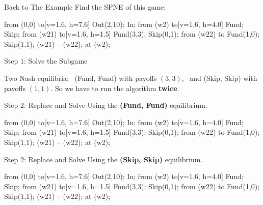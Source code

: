 \begin{frame}{Back to The Example}
Find the SPNE of this game:
\centering
\begin{gametree}[player names={Wayfair, IKEA}, scale=0.72, subgame={depth=9mm}]
  \branch[player=1, root=w, label=90] from (0,0) to[v=1.6, h=7.6] {Out(2,10); In};
  \branch[player=1, label=0] from (w2) to[v=1.6, h=4.0] {Fund; Skip};
  \branch[player=2, label=none] from (w21) to[v=1.6, h=1.5]
    {Fund(3,3); Skip(0,1)};
  \branch from (w22) to {Fund(1,0); Skip(1,1)};
  \informset (w21) -- (w22);
  \subgame[inner sep=4.6ex] at (w2);
\end{gametree}
\vspace{-0.15in}
\end{frame}


\begin{frame}{Step 1: Solve the Subgame}
\centering
\begin{matrixgame}[top={Fund, Skip}, left={Fund, Skip}, player names={Wayfair, IKEA}, br]
\end{matrixgame}
\bsk
\raggedright
Two Nash equilibria: \ (Fund, Fund) with payoffs $(3,3)$, \ and
(Skip, Skip) with payoffs $(1,1)$.
\vfill
So we have to run the algorithm \textbf{twice}.
\vspace{-0.4in}
\end{frame}

\begin{frame}{Step 2: Replace and Solve}
Using the \textbf{(Fund, Fund)} equilibrium.
\bsk
\centering
\begin{gametree}[player names={Wayfair, IKEA}, scale=0.72, subgame={depth=9mm}]
  \branch[player=1, root=w, label=90] from (0,0) to[v=1.6, h=7.6] {Out(2,10); In};
  \branch[player=1, label=0] from (w2) to[v=1.6, h=4.0] {Fund; Skip};
  \branch[player=2, label=none] from (w21) to[v=1.6, h=1.5]
    {Fund(3,3); Skip(0,1)};
  \branch from (w22) to {Fund(1,0); Skip(1,1)};
  \informset (w21) -- (w22);
  \subgame[inner sep=4.6ex] at (w2);
\end{gametree}
\vspace{-0.15in}
\end{frame}

\begin{frame}{Step 2: Replace and Solve}
Using the \textbf{(Skip, Skip)} equilibrium.
\bsk
\centering
\begin{gametree}[player names={Wayfair, IKEA}, scale=0.72, subgame={depth=9mm}]
  \branch[player=1, root=w, label=90] from (0,0) to[v=1.6, h=7.6] {Out(2,10); In};
  \branch[player=1, label=0] from (w2) to[v=1.6, h=4.0] {Fund; Skip};
  \branch[player=2, label=none] from (w21) to[v=1.6, h=1.5]
    {Fund(3,3); Skip(0,1)};
  \branch from (w22) to {Fund(1,0); Skip(1,1)};
  \informset (w21) -- (w22);
  \subgame[inner sep=4.6ex] at (w2);
\end{gametree}
\vspace{-0.15in}
\end{frame}

